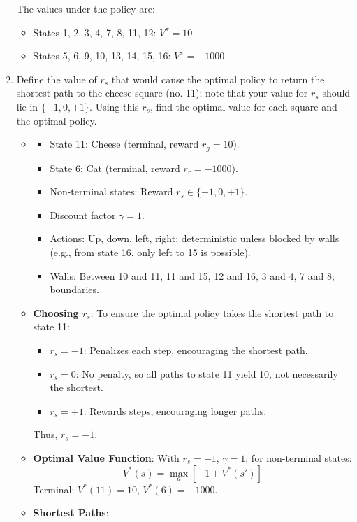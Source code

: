 \documentclass[a3paper,12pt]{extarticle} %
\begin{document}
\begin{enumerate}
The values under the policy are:
\begin{itemize}
    \item States 1, 2, 3, 4, 7, 8, 11, 12: \( V^\pi = 10 \)
    \item States 5, 6, 9, 10, 13, 14, 15, 16: \( V^\pi = -1000 \)
\end{itemize}
    
    \item Define the value of $r_s$ that would cause the optimal policy to return the shortest path to the
    cheese square (no. 11); note that your value for $r_s$ should lie in $\{-1, 0, +1\}$. Using this $r_s$, find the
    optimal value for each square and the optimal policy.
\begin{itemize}
    \item 
    \begin{itemize}
        \item State 11: Cheese (terminal, reward \( r_g = 10 \)).
        \item State 6: Cat (terminal, reward \( r_r = -1000 \)).
        \item Non-terminal states: Reward \( r_s \in \{-1, 0, +1\} \).
        \item Discount factor \( \gamma = 1 \).
        \item Actions: Up, down, left, right; deterministic unless blocked by walls (e.g., from state 16, only left to 15 is possible).
        \item Walls: Between 10 and 11, 11 and 15, 12 and 16, 3 and 4, 7 and 8; boundaries.
    \end{itemize}
    \item \textbf{Choosing \( r_s \)}: To ensure the optimal policy takes the shortest path to state 11:
    \begin{itemize}
        \item \( r_s = -1 \): Penalizes each step, encouraging the shortest path.
        \item \( r_s = 0 \): No penalty, so all paths to state 11 yield 10, not necessarily the shortest.
        \item \( r_s = +1 \): Rewards steps, encouraging longer paths.
    \end{itemize}
    Thus, \( r_s = -1 \).
    \item \textbf{Optimal Value Function}: With \( r_s = -1 \), \( \gamma = 1 \), for non-terminal states:
    \[
    V^*(s) = \max_a \left[ -1 + V^*(s') \right]
    \]
    Terminal: \( V^*(11) = 10 \), \( V^*(6) = -1000 \).
    \item \textbf{Shortest Paths}:

\end{itemize}
\end{enumerate}
\end{document}
